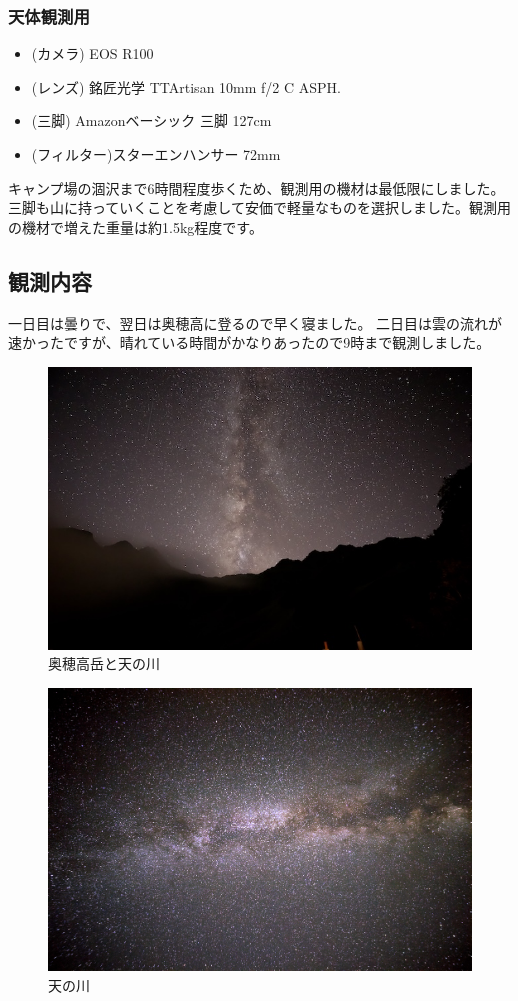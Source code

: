 \documentclass[../main]{subfiles}
\begin{document}
\subsubsection{天体観測用}

\begin{itemize}
  \item (カメラ) EOS R100
  \item (レンズ) 銘匠光学 TTArtisan 10mm f/2 C ASPH.
  \item (三脚) Amazonベーシック 三脚 127cm
  \item (フィルター)スターエンハンサー 72mm
\end{itemize}

キャンプ場の涸沢まで6時間程度歩くため、観測用の機材は最低限にしました。三脚も山に持っていくことを考慮して安価で軽量なものを選択しました。観測用の機材で増えた重量は約1.5kg程度です。

\subsection{観測内容}
一日目は曇りで、翌日は奥穂高に登るので早く寝ました。
二日目は雲の流れが速かったですが、晴れている時間がかなりあったので9時まで観測しました。\\

\begin{figure}[H]
  \centering
  \includegraphics[width=0.7\linewidth]{sections/mori/IMG_2378.jpg}
  \caption{奥穂高岳と天の川}
\end{figure}

\begin{figure}[H]
  \centering
  \includegraphics[width=0.7\linewidth]{sections/mori/amanogawa_okuhotaka.jpg}
  \caption{天の川}
\end{figure}
\end{document}
